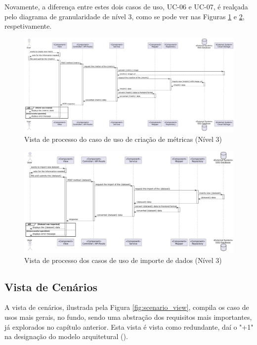 Novamente, a diferença entre estes dois casos de uso, UC-06 e UC-07, é realçada pelo diagrama de granularidade de nível 3, como se pode ver nas Figuras \ref{fig:UC6-lvl3} e \ref{fig:UC7-lvl3}, respetivamente.


\begin{figure}[H]
\centering
\includegraphics[width=\linewidth]{frontmatter/assets/diagrams/Process Views/LVL3/uc-06-lvl3.png}
\caption{Vista de processo do caso de uso de criação de métricas (Nível 3)}
\label{fig:UC6-lvl3}
\end{figure}

\begin{figure}[H]
\centering
\includegraphics[width=\linewidth]{frontmatter/assets/diagrams/Process Views/LVL3/uc-07-lvl3.png}
\caption{Vista de processo dos casos de uso de importe de dados (Nível 3)}
\label{fig:UC7-lvl3}
\end{figure}


\subsection{Vista de Cenários}

A vista de cenários, ilustrada pela Figura \ref{fig:scenario_view}, compila os caso de usos mais gerais, no fundo, sendo uma abstração dos requisitos mais importantes, já explorados no capítulo anterior. Esta vista é vista como redundante, daí o "+1" na designação do modelo arquitetural (\cite{Kruchten1995}).

